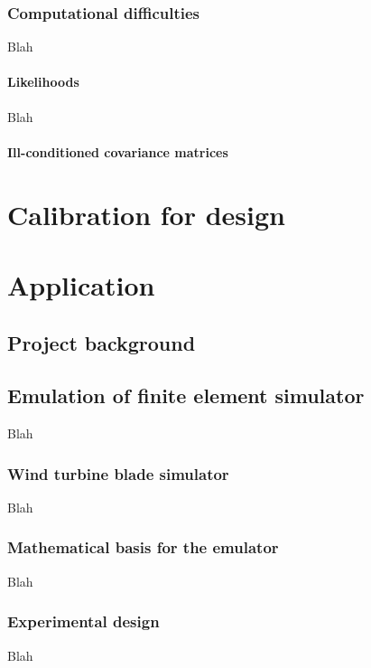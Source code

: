 \documentclass{article}
\begin{document}
\subsubsection{Computational difficulties}
Blah

\paragraph{Likelihoods}
Blah

\paragraph{Ill-conditioned covariance matrices}

\section{Calibration for design}



\section{Application}

\subsection{Project background}

\subsection{Emulation of finite element simulator}
Blah

\subsubsection{Wind turbine blade simulator}
Blah

\subsubsection{Mathematical basis for the emulator}
Blah

\subsubsection{Experimental design}
Blah
\end{document}
